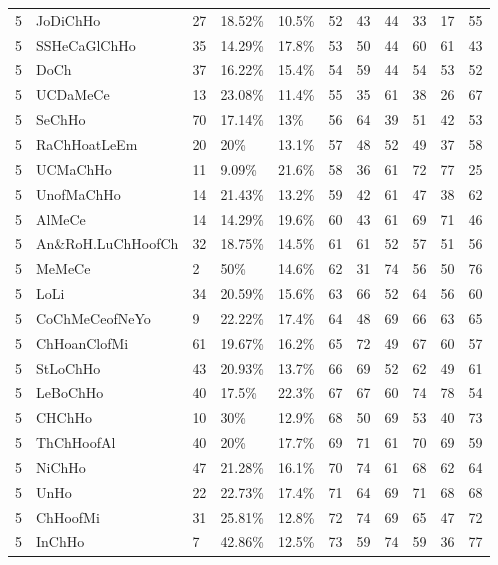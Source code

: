 \begin{longtable}{lllllrrrrrr}
  5 & JoDiChHo & 27 & 18.52\% & 10.5\% &  52 &  43 &  44 &  33 &  17 &  55 \\ 
  5 & SSHeCaGlChHo & 35 & 14.29\% & 17.8\% &  53 &  50 &  44 &  60 &  61 &  43 \\ 
  5 & DoCh & 37 & 16.22\% & 15.4\% &  54 &  59 &  44 &  54 &  53 &  52 \\ 
  5 & UCDaMeCe & 13 & 23.08\% & 11.4\% &  55 &  35 &  61 &  38 &  26 &  67 \\ 
  5 & SeChHo & 70 & 17.14\% & 13\% &  56 &  64 &  39 &  51 &  42 &  53 \\ 
  5 & RaChHoatLeEm & 20 & 20\% & 13.1\% &  57 &  48 &  52 &  49 &  37 &  58 \\ 
  5 & UCMaChHo & 11 & 9.09\% & 21.6\% &  58 &  36 &  61 &  72 &  77 &  25 \\ 
  5 & UnofMaChHo & 14 & 21.43\% & 13.2\% &  59 &  42 &  61 &  47 &  38 &  62 \\ 
  5 & AlMeCe & 14 & 14.29\% & 19.6\% &  60 &  43 &  61 &  69 &  71 &  46 \\ 
  5 & An\&RoH.LuChHoofCh & 32 & 18.75\% & 14.5\% &  61 &  61 &  52 &  57 &  51 &  56 \\ 
  5 & MeMeCe & 2 & 50\% & 14.6\% &  62 &  31 &  74 &  56 &  50 &  76 \\ 
  5 & LoLi & 34 & 20.59\% & 15.6\% &  63 &  66 &  52 &  64 &  56 &  60 \\ 
  5 & CoChMeCeofNeYo & 9 & 22.22\% & 17.4\% &  64 &  48 &  69 &  66 &  63 &  65 \\ 
  5 & ChHoanClofMi & 61 & 19.67\% & 16.2\% &  65 &  72 &  49 &  67 &  60 &  57 \\ 
  5 & StLoChHo & 43 & 20.93\% & 13.7\% &  66 &  69 &  52 &  62 &  49 &  61 \\ 
  5 & LeBoChHo & 40 & 17.5\% & 22.3\% &  67 &  67 &  60 &  74 &  78 &  54 \\ 
  5 & CHChHo & 10 & 30\% & 12.9\% &  68 &  50 &  69 &  53 &  40 &  73 \\ 
  5 & ThChHoofAl & 40 & 20\% & 17.7\% &  69 &  71 &  61 &  70 &  69 &  59 \\ 
  5 & NiChHo & 47 & 21.28\% & 16.1\% &  70 &  74 &  61 &  68 &  62 &  64 \\ 
  5 & UnHo & 22 & 22.73\% & 17.4\% &  71 &  64 &  69 &  71 &  68 &  68 \\ 
  5 & ChHoofMi & 31 & 25.81\% & 12.8\% &  72 &  74 &  69 &  65 &  47 &  72 \\ 
  5 & InChHo & 7 & 42.86\% & 12.5\% &  73 &  59 &  74 &  59 &  36 &  77 \\ 

\end{longtable}
